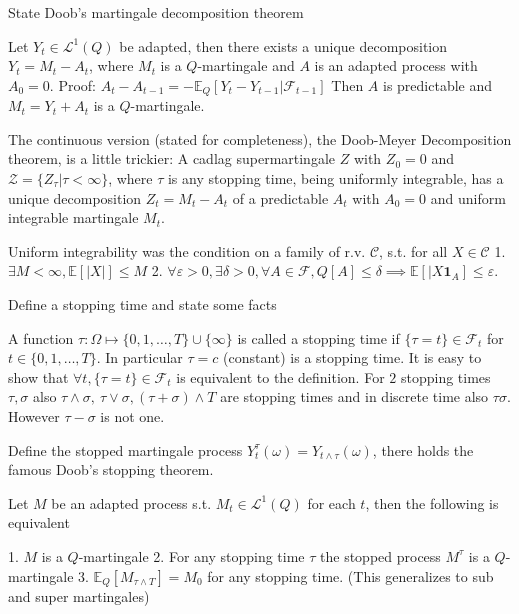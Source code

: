 State Doob's martingale decomposition theorem

Let \( Y_t \in \mathcal{L}^1(Q) \) be adapted, then there exists a unique decomposition
\( Y_t = M_t - A_t \), where \( M_t \) is a \( Q \)-martingale and \( A \) is an adapted process
with \( A_0 = 0 \).
Proof:
\( A_t - A_{t-1} = -\mathbb{E}_Q[Y_t - Y_{t-1}|\mathcal{F}_{t-1}] \)
Then \( A \) is predictable and \( M_t = Y_t + A_t \) is a \( Q \)-martingale.

The continuous version (stated for completeness), the Doob-Meyer Decomposition theorem, is a little trickier:
A cadlag supermartingale \( Z \) with \( Z_0 = 0 \) and \( \mathcal{Z} = \{Z_\tau | \tau < \infty \} \),
where \( \tau \) is any stopping time, being uniformly integrable, has a unique decomposition 
 \( Z_t = M_t - A_t \) of a predictable \( A_t \) with \( A_0 = 0 \) and uniform integrable martingale \( M_t \).

Uniform integrability was the condition on a family of r.v. \( \mathcal{C} \), s.t. for all \( X \in \mathcal{C} \)
1. \( \exists M < \infty, \mathbb{E}[|X|] \leq M \)
2. \( \forall \varepsilon > 0, \exists \delta > 0, \forall A \in \mathcal{F}, Q[A] \leq \delta \implies \mathbb{E}[|X \mathbf{1}_A] \leq \varepsilon \).


Define a stopping time and state some facts 

A function \( τ : \Omega \mapsto \{0, 1, \dots, T \} \cup \{ \infty \} \) is called a stopping
time if \( \{ \tau = t \} \in \mathcal{F}_t \) for \( t \in \{0, 1, \dots, T \} \).
In particular \( \tau = c \) (constant) is a stopping time.
It is easy to show that \(\forall t, \{ \tau = t \} \in \mathcal{F}_t  \) is equivalent to the definition.
For \( 2 \) stopping times \( \tau, \sigma \) also \( \tau \wedge \sigma,\ \tau \vee \sigma, (\tau + \sigma) \wedge T \)
are stopping times and in discrete time also \( \tau\sigma \). However \( \tau - \sigma \) is not one.

Define the stopped martingale process \( Y^\tau_t(\omega) = Y_{t \wedge \tau}(\omega) \),
there holds the famous Doob's stopping theorem.

Let \( M \) be an adapted process s.t. \( M_t \in \mathcal{L}^1(Q) \) for each \( t \), then
the following is equivalent

1. \( M \) is a \( Q \)-martingale
2. For any stopping time \( \tau \) the stopped process \( M^\tau \) is a \( Q \)-martingale
3. \( \mathbb{E}_Q[M_{\tau \wedge T}] = M_0 \) for any stopping time.
(This generalizes to sub and super martingales)


